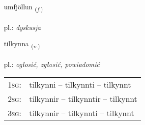 \documentclass[frontgrid, backgrid]{flacards}\usepackage[]{graphicx}\usepackage[]{xcolor}
\begin{document}
\renewcommand{\flhead}{\vskip5pt \fboxsep=0pt {\small\bfseries\footnotesize Nafnorð | rzeczownik}}
\renewcommand{\fcfoot}{\vskip5pt \fboxsep=0pt \hspace{2pt}{\small\bfseries\footnotesize 1K}}

\renewcommand{\blhead}{\vskip5pt {\small\bfseries\footnotesize Nafnorð | rzeczownik }}
\renewcommand{\bcfoot}{\vskip5pt \hspace{2pt}{\small\bfseries\footnotesize 1K}}


{umfjöllun \small{\textsubscript{(\textit{f.})}} \\[1ex] %
\textphonetic{[ʏmfjœtlʏn]} \\
pl.: \emph{dyskusja} \\  [2ex]
\renewcommand*{\arraystretch}{0.8}
}

\renewcommand{\flhead}{\vskip5pt \fboxsep=0pt {\small\bfseries\footnotesize Sagnorð | czasownik}}
\renewcommand{\fcfoot}{\vskip5pt \fboxsep=0pt \hspace{2pt}{\small\bfseries\footnotesize 1K}}

\renewcommand{\blhead}{\vskip5pt {\small\bfseries\footnotesize Sagnorð | czasownik }}
\renewcommand{\bcfoot}{\vskip5pt \hspace{2pt}{\small\bfseries\footnotesize 1K}}


{tilkynna \small{\textsubscript{(\textit{v.})}} \\[1ex] %
\textphonetic{[tʰɪlcʰɪna]} \\
pl.: \emph{ogłosić, zgłosić, powiadomić} \\  [2ex]
\renewcommand*{\arraystretch}{0.8}
\begin{tabular}{p{1cm}l}
\textsc{1sg}: & tilkynni -- tilkynnti -- tilkynnt \\ 
\textsc{2sg}: & tilkynnir -- tilkynntir -- tilkynnt \\ 
\textsc{3sg}: & tilkynnir -- tilkynnti -- tilkynnt \\ 
\end{tabular}
}
\end{document}
